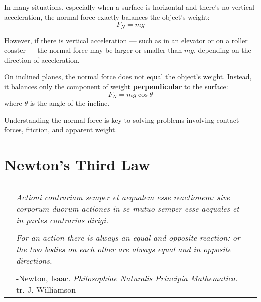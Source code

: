 	 In many situations, especially when a surface is horizontal and there’s no vertical acceleration, the normal force exactly balances the object’s weight:
	 \[
	 F_N = mg
	 \]
	 
	 However, if there is vertical acceleration — such as in an elevator or on a roller coaster — the normal force may be larger or smaller than \( mg \), depending on the direction of acceleration.
	 
	 On inclined planes, the normal force does not equal the object's weight. Instead, it balances only the component of weight \textbf{perpendicular} to the surface:
	 \[
	 F_N = mg \cos\theta
	 \]
	 where \( \theta \) is the angle of the incline.
	 
	 Understanding the normal force is key to solving problems involving contact forces, friction, and apparent weight.
	 
	
	\section{Newton's Third Law}
		\begin{tabular}{p{.75in} p{4.5in} p{.75in}}
		&  &  \\
		& & \\
		& \textit{Actioni contrariam semper et aequalem esse reactionem: sive corporum duorum actiones in se mutuo semper esse aequales et in partes contrarias dirigi. } & \\
		& & \\
		& \textit{For an action there is always an equal and opposite reaction: or the two bodies on each other are always equal and in opposite directions. } & \\
		& & \\
		 & {-Newton, Isaac.  \textit{Philosophiae Naturalis Principia Mathematica}.  tr. J. Williamson} & \\
		
	\end{tabular}
	
